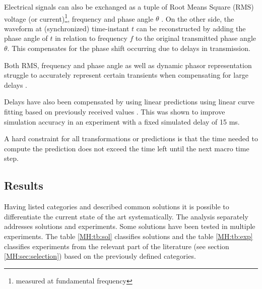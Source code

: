 \documentclass[a4paper]{atseminar}
\begin{document}
Electrical signals can also be exchanged as a tuple of Root Means Square (RMS) voltage (or current)\footnote{measured at fundamental frequency}, frequency and phase angle  $\theta$ \cite{stevic2017fidelity}. On the other side, the waveform at (synchronized) time-instant $t$ can be reconstructed by adding the phase angle of $t$ in relation to frequency $f$ to the original transmitted phase angle $\theta$. This compensates for the phase shift occurring due to delays in transmission. 


Both RMS, frequency and phase angle as well as dynamic phasor representation struggle to accurately represent certain transients when compensating for large delays \cite{stevic2017fidelity}.


Delays have also been compensated by using linear predictions using linear curve fitting based on previously received values \cite{liu2016}. This was shown to improve simulation accuracy in an experiment with a fixed simulated delay of 15 ms.

A hard constraint for all transformations or predictions is that the time needed to compute the prediction does not exceed the time left until the next macro time step.



\subsection{Results}
\label{MH:sec:results}

Having listed categories and described common solutions it is possible to differentiate the current state of the art systematically. The analysis separately addresses solutions and experiments. Some solutions have been tested in multiple experiments. The table \ref{MH:tb:sol} classifies solutions and the table \ref{MH:tb:exp} classifies experiments from the relevant part of the literature (see section \ref{MH:sec:selection}) based on the previously defined categories. 

\newcommand{\citevillas}{stevic2017europe, monti2018}
\end{document}

